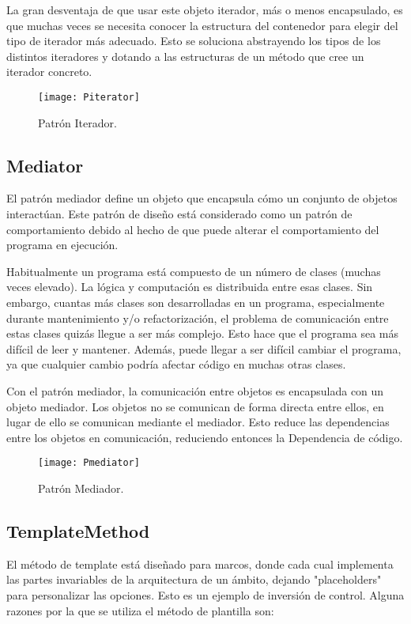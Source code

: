 La gran desventaja de que usar este objeto iterador, más o menos encapsulado, es que muchas veces se necesita conocer la estructura del contenedor para elegir del tipo de iterador más adecuado. Esto se soluciona abstrayendo los tipos de los distintos iteradores y dotando a las estructuras de un método que cree un iterador concreto.

\begin{figure}[H]
\centering
\texttt{[image: Piterator]}
\caption{Patrón Iterador.}
\end{figure}

\subsection{Mediator}

El patrón mediador define un objeto que encapsula cómo un conjunto de objetos interactúan. Este patrón de diseño está considerado como un patrón de comportamiento debido al hecho de que puede alterar el comportamiento del programa en ejecución.

Habitualmente un programa está compuesto de un número de clases (muchas veces elevado). La lógica y computación es distribuida entre esas clases. Sin embargo, cuantas más clases son desarrolladas en un programa, especialmente durante mantenimiento y/o refactorización, el problema de comunicación entre estas clases quizás llegue a ser más complejo. Esto hace que el programa sea más difícil de leer y mantener. Además, puede llegar a ser difícil cambiar el programa, ya que cualquier cambio podría afectar código en muchas otras clases.

Con el patrón mediador, la comunicación entre objetos es encapsulada con un objeto mediador. Los objetos no se comunican de forma directa entre ellos, en lugar de ello se comunican mediante el mediador. Esto reduce las dependencias entre los objetos en comunicación, reduciendo entonces la Dependencia de código.


\begin{figure}[H]
\centering
\texttt{[image: Pmediator]}
\caption{Patrón Mediador.}
\end{figure}

\subsection{TemplateMethod}

El método de template está diseñado para marcos, donde cada cual implementa las partes invariables de la arquitectura de un ámbito, dejando "placeholders" para personalizar las opciones. Esto es un ejemplo de inversión de control. Alguna razones por la que se utiliza el método de plantilla son:

